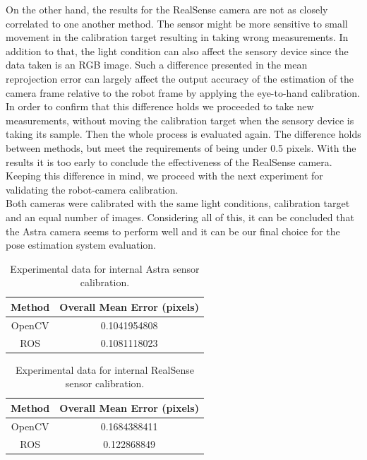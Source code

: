 On the other hand, the results for the RealSense camera are not as closely correlated to one another method. The sensor might be more sensitive to small movement in the calibration target resulting in taking wrong measurements. In addition to that, the light condition can also affect the sensory device since the data taken is an RGB image. Such a difference presented in the mean reprojection error can largely affect the output accuracy of the estimation of the camera frame relative to the robot frame by applying the eye-to-hand calibration. In order to confirm that this difference holds we proceeded to take new measurements, without moving the calibration target when the sensory device is taking its sample. Then the whole process is evaluated again. The difference holds between methods, but meet the requirements of being under 0.5 pixels. With the results it is too early to conclude the effectiveness of the RealSense camera. Keeping this difference in mind, we proceed with the next experiment for validating the robot-camera calibration.  \\
Both cameras were calibrated with the same light conditions, calibration target and an equal number of images. Considering all of this, it can be concluded that the Astra camera seems to perform well and it can be our final choice for the pose estimation system evaluation. 

\begin{table}[ht]
\renewcommand{\arraystretch}{1.3}
\caption{Experimental data for internal Astra sensor calibration.}
\label{astra1}
\centering
\begin{tabular}{|c||c|}
\hline
Method & Overall Mean Error (pixels)\\
\hline
OpenCV &  0.1041954808\\
\hline
ROS &  0.1081118023\\
\hline
\end{tabular}
\end{table}

\begin{table}[ht]
\renewcommand{\arraystretch}{1.3}
\caption{Experimental data for internal RealSense sensor calibration.}
\label{real1}
\centering
\begin{tabular}{|c||c|}
\hline
Method & Overall Mean Error (pixels)\\
\hline
OpenCV &  0.1684388411\\
\hline
ROS &  0.122868849\\
\hline
\end{tabular}
\end{table}

